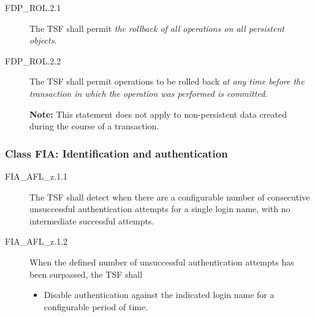 \documentclass[12pt,english]{scrbook}
\begin{document}
\begin{description}

\item[FDP{\_}ROL.2.1 ]

The TSF shall permit \emph{the rollback of all operations on all persistent
objects}.

\item[FDP{\_}ROL.2.2 ]


The TSF shall permit operations to be rolled back \emph{at any time before the
transaction in which the operation was performed is committed}.

\textbf{Note:} This statement does not apply to non-persistent data created
during the course of a transaction.

\end{description}



\subsubsection{Class FIA: Identification and authentication}





\begin{description}

\item[FIA{\_}AFL{\_}z.1.1]

The TSF shall detect when there are a configurable number of consecutive
unsuccessful authentication attempts for a single login name,
with no intermediate successful attempts.

\item[FIA{\_}AFL{\_}z.1.2 ]

When the defined number of unsuccessful authentication attempts
has been surpassed, the TSF shall

\begin{itemize}
  
  \item Disable authentication against the indicated login name for a
  configurable period of time.

\end{itemize}


\end{description}
\end{document}
